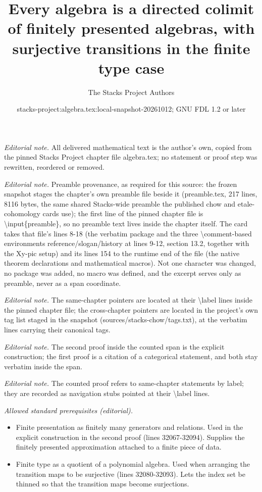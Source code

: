 \documentclass[10pt,a4paper]{amsart}
\title{Every algebra is a directed colimit of finitely presented algebras, with surjective transitions in the finite type case}
\author{The Stacks Project Authors}
\date{stacks-project:algebra.tex:local-snapshot-20261012; GNU FDL 1.2 or later}
\theoremstyle{plain}
\theoremstyle{definition}
\theoremstyle{remark}
\numberwithin{equation}{subsection}
\begin{document}
\maketitle
\noindent\textit{Editorial note.} All delivered mathematical text is the author's own, copied from the pinned Stacks Project chapter file algebra.tex; no statement or proof step was rewritten, reordered or removed.\par\medskip
\noindent\textit{Editorial note.} Preamble provenance, as required for this source: the frozen snapshot stages the chapter's own preamble file beside it (preamble.tex, 217 lines, 8116 bytes, the same shared Stacks-wide preamble the published chow and etale-cohomology cards use); the first line of the pinned chapter file is \textbackslash{}input\{preamble\}, so no preamble text lives inside the chapter itself. The card takes that file's lines 8-18 (the verbatim package and the three \textbackslash{}comment-based environments reference/slogan/history at lines 9-12, section 13.2, together with the Xy-pic setup) and its lines 154 to the runtime end of the file (the native theorem declarations and mathematical macros). Not one character was changed, no package was added, no macro was defined, and the excerpt serves only as preamble, never as a span coordinate.\par\medskip
\noindent\textit{Editorial note.} The same-chapter pointers are located at their \textbackslash{}label lines inside the pinned chapter file; the cross-chapter pointers are located in the project's own tag list staged in the snapshot (sources/stacks-chow/tags.txt), at the verbatim lines carrying their canonical tags.\par\medskip
\noindent\textit{Editorial note.} The second proof inside the counted span is the explicit construction; the first proof is a citation of a categorical statement, and both stay verbatim inside the span.\par\medskip
\noindent\textit{Editorial note.} The counted proof refers to same-chapter statements by label; they are recorded as navigation stubs pointed at their \textbackslash{}label lines.\par\medskip
\noindent\textit{Allowed standard prerequisites (editorial).}\begin{itemize}
\item Finite presentation as finitely many generators and relations. Used in the explicit construction in the second proof (lines 32067-32094). Supplies the finitely presented approximation attached to a finite piece of data.
\item Finite type as a quotient of a polynomial algebra. Used when arranging the transition maps to be surjective (lines 32080-32093). Lets the index set be thinned so that the transition maps become surjections.
\end{itemize}\medskip
\end{document}
